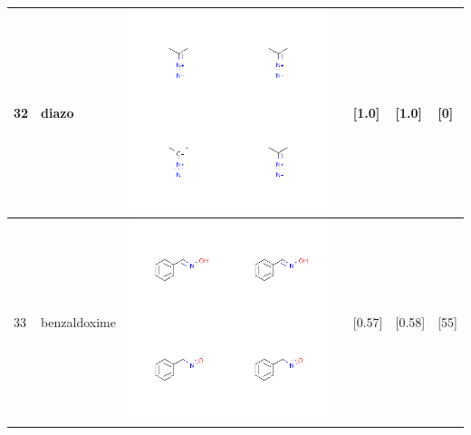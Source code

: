 \begin{longtable}{|l|l|l|l|l|l|l|}
\hline
32 & diazo & \includegraphics[scale=0.6]{diazoCA.png} & & [1.0]& [1.0] & [0] \\
\hline
33 & benzaldoxime & \includegraphics[scale=0.6]{benzaldoximeCA.png} & & [0.57]& [0.58] & [55] \\
\hline

\end{longtable}

